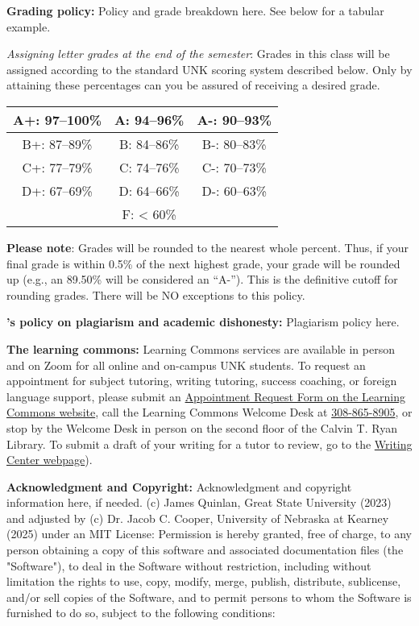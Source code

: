\documentclass[11pt]{article}
\begin{document}
	\skippers
	\noindent\textbf{Grading policy:} Policy and grade breakdown here. See below for a tabular example.
	
	\vskip0.025in
	\noindent\textit{Assigning letter grades at the end of the semester}: Grades in this class will be assigned according to the standard UNK scoring system described below. Only by attaining these percentages can you be assured of receiving a desired grade. 
	
	\begin{center}
		\begin{tabular}{| c | c | c |}
			\hline
			A+: 97--100\% & A: 94--96\% & A-: 90--93\%  \\
			\hline
			B+: 87--89\% & B: 84--86\% & B-: 80--83\%  \\
			\hline
			C+: 77--79\% & C: 74--76\% & C-: 70--73\%  \\
			\hline
			D+: 67--69\% & D: 64--66\% & D-: 60--63\%  \\
			\hline
			 & F: < 60\% & \\
			 \hline
		\end{tabular}
	\end{center}
	
	\vskip0.025in
	\noindent\textbf{Please note}: Grades will be rounded to the nearest whole percent. Thus, if your final grade is within 0.5\% of the next highest grade, your grade will be rounded up (e.g., an 89.50\% will be considered an “A-”). This is the definitive cutoff for rounding grades. There will be NO exceptions to this policy. 
	
	\skippers
	\noindent\textbf{\shortname's policy on plagiarism and academic dishonesty:} Plagiarism policy here.
	
	\skippers
	\noindent\textbf{The learning commons:} Learning Commons services are available in person and on Zoom for all online and on-campus UNK students. To request an appointment for subject tutoring, writing tutoring, success coaching, or foreign language support, please submit an \href{https://www.unk.edu/offices/learning_commons/index.php}{Appointment Request Form on the Learning Commons website}, call the Learning Commons Welcome Desk at \href{tel:13088658905}{308-865-8905}, or stop by the Welcome Desk in person on the second floor of the Calvin T. Ryan Library. To submit a draft of your writing for a tutor to review, go to the \href{https://www.unk.edu/offices/learning_commons/writing-center.php}{Writing Center webpage}).
	
	\skippers
	\noindent\textbf{Acknowledgment and Copyright:} Acknowledgment and copyright information here, if needed. (c) James Quinlan, Great State University (2023) and adjusted by (c) Dr. Jacob C. Cooper, University of Nebraska at Kearney (2025) under an MIT License: Permission is hereby granted, free of charge, to any person obtaining a copy of this software and associated documentation files (the "Software"), to deal in the Software without restriction, including without limitation the rights to use, copy, modify, merge, publish, distribute, sublicense, and/or sell copies of the Software, and to permit persons to whom the Software is furnished to do so, subject to the following conditions:
	
\end{document}
